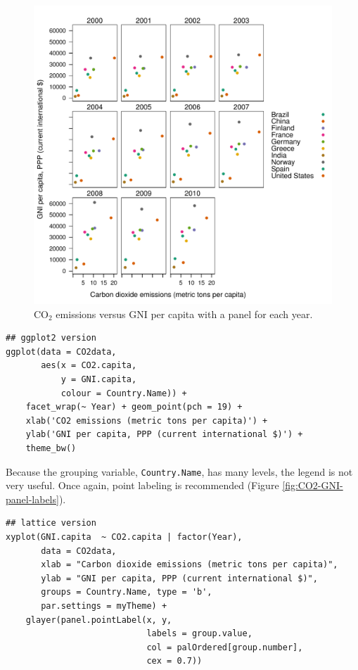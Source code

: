 \documentclass[smallroyalvopaper]{memoir}
\begin{document}
\begin{figure}[htbp]
\centering
\includegraphics[width=.9\linewidth]{figs/CO2_capita_panel.pdf}
\caption{\(\mathrm{CO_2}\) emissions versus GNI per capita with a panel for each year. \label{fig:CO2-GNI-panel}}
\end{figure}

\lstset{language=r,label= ,caption= ,captionpos=b,numbers=none}
\begin{lstlisting}
## ggplot2 version
ggplot(data = CO2data,
       aes(x = CO2.capita,
           y = GNI.capita,
           colour = Country.Name)) +
    facet_wrap(~ Year) + geom_point(pch = 19) + 
    xlab('CO2 emissions (metric tons per capita)') +
    ylab('GNI per capita, PPP (current international $)') +
    theme_bw()
\end{lstlisting}

Because the grouping variable, \texttt{Country.Name}, has many levels, the
legend is not very useful. Once again, point labeling is recommended
(Figure \ref{fig:CO2-GNI-panel-labels}).

\lstset{language=r,label= ,caption= ,captionpos=b,numbers=none}
\begin{lstlisting}
## lattice version
xyplot(GNI.capita  ~ CO2.capita | factor(Year),
       data = CO2data,
       xlab = "Carbon dioxide emissions (metric tons per capita)",
       ylab = "GNI per capita, PPP (current international $)",
       groups = Country.Name, type = 'b',
       par.settings = myTheme) + 
    glayer(panel.pointLabel(x, y,
                            labels = group.value,
                            col = palOrdered[group.number],
                            cex = 0.7))
\end{lstlisting}
\end{document}
